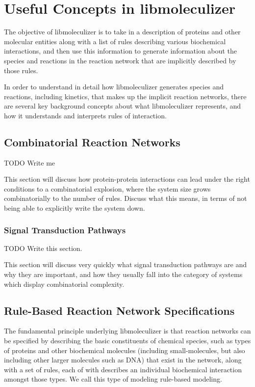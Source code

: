 \chapter{Useful Concepts in libmoleculizer}
\label{chap:conceptualOverviewChapter}

The objective of libmoleculizer is to take in a description of
proteins and other molecular entities along with a list of rules
describing various biochemical interactions, and then use this
information to generate information about the species and reactions in
the reaction network that are implicitly described by those rules.

In order to understand in detail how libmoleculizer generates species
and reactions, including kinetics, that makes up the implicit reaction
networks, there are several key background concepts about what
libmoleculizer represents, and how it understands and interprets rules
of interaction.

\section{Combinatorial Reaction Networks}
TODO Write me

This section will discuss how protein-protein interactions can lead
under the right conditions to a combinatorial explosion, where the
system size grows combinatorially to the number of rules.  Discuss
what this means, in terms of not being able to explicitly write the
system down.

\subsection{Signal Transduction Pathways}
TODO Write this section.

This section will discuss very quickly what signal transduction
pathways are and why they are important, and how they usually fall
into the category of systems which display combinatorial complexity.  

\section{Rule-Based Reaction Network Specifications}
\label{concRuleBasedSpec}

The fundamental principle underlying libmoleculizer is that reaction
networks can be specified by describing the basic constituents of
chemical species, such as types of proteins and other biochemical molecules
(including small-molecules, but also including other larger molecules
such as DNA) that exist in the network, along with a set of
rules, each of with describes an individual biochemical interaction
amongst those types.  We call this type of modeling rule-based
modeling.  


